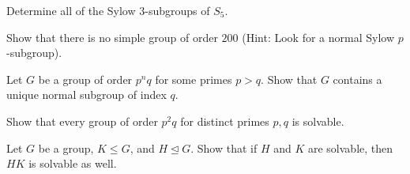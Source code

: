 \documentclass{problemset}
\begin{document}
\begin{exercise} Determine all of the Sylow \(3\)-subgroups of \(S_5\).
\end{exercise}


\begin{exercise} Show that there is no simple group of order \(200\) (Hint: Look for a normal Sylow \(p\)-subgroup).
\end{exercise}


\begin{exercise} 
Let \(G\) be a group of order \(p^nq\) for some primes \(p>q\). Show that \(G\) contains a unique normal subgroup of index \(q\).
\end{exercise}


\begin{exercise} Show that every group of order \(p^2q\) for distinct primes \(p,q\) is solvable.
\end{exercise}


\begin{exercise} 
Let \(G\) be a group, \(K \leq G\), and \(H \unlhd G\).  Show that if \(H\) and \(K\) are solvable, then \(HK\) is solvable as well.
\end{exercise}




\end{document}
